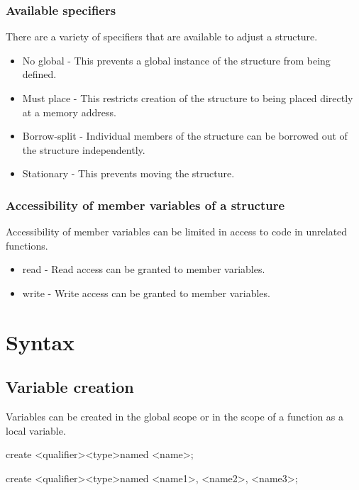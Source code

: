 \documentclass[12pt]{article}
\begin{document}
\subsubsection { Available specifiers }

There are a variety of specifiers that are available to adjust a structure.

\begin{itemize}
\item No global - This prevents a global instance of the structure from being defined.
\item Must place - This restricts creation of the structure to being placed directly at a memory address.
\item Borrow-split - Individual members of the structure can be borrowed out of the structure independently.
\item Stationary - This prevents moving the structure.
\end{itemize}

\subsubsection { Accessibility of member variables of a structure }

Accessibility of member variables can be limited in access to code in unrelated functions.
\begin{itemize}
\item read - Read access can be granted to member variables.
\item write - Write access can be granted to member variables.
\end{itemize}

\section {Syntax}

\subsection {Variable creation}

Variables can be created in the global scope or in the scope of a function as a local variable.

create \textless qualifier\textgreater  \space \textless type\textgreater \space named \textless name\textgreater;

create \textless qualifier\textgreater  \space \textless type\textgreater \space named \textless name1\textgreater , \textless name2\textgreater , \textless name3\textgreater;
\end{document}
